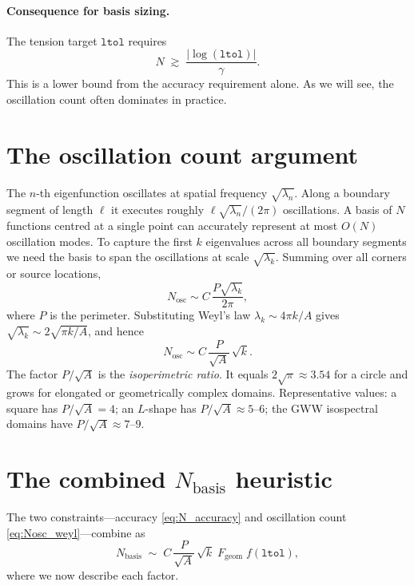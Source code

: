 \documentclass[11pt]{article}
\newcommand{\Nbasis}{N_{\mathrm{basis}}}
\newcommand{\Nosc}{N_{\mathrm{osc}}}
\newcommand{\ltol}{\texttt{ltol}}
\begin{document}
\paragraph{Consequence for basis sizing.}
The tension target $\ltol$ requires
\begin{equation}\label{eq:N_accuracy}
  N \;\gtrsim\; \frac{|\log(\ltol)|}{\gamma}.
\end{equation}
This is a lower bound from the accuracy requirement alone.  As we will see, the
oscillation count often dominates in practice.

\section{The oscillation count argument}

The $n$-th eigenfunction oscillates at spatial frequency $\sqrt{\lambda_n}$.
Along a boundary segment of length $\ell$ it executes roughly
$\ell\sqrt{\lambda_n}/(2\pi)$ oscillations.  A basis of $N$ functions centred
at a single point can accurately represent at most $O(N)$ oscillation modes.
To capture the first $k$ eigenvalues across all boundary segments we need the
basis to span the oscillations at scale $\sqrt{\lambda_k}$.  Summing over all
corners or source locations,
\begin{equation}\label{eq:Nosc}
  \Nosc \sim C\,\frac{P\sqrt{\lambda_k}}{2\pi},
\end{equation}
where $P$ is the perimeter.  Substituting Weyl's law
$\lambda_k \sim 4\pi k/A$ gives $\sqrt{\lambda_k} \sim 2\sqrt{\pi k/A}$, and
hence
\begin{equation}\label{eq:Nosc_weyl}
  \Nosc \sim C\,\frac{P}{\sqrt{A}}\,\sqrt{k}.
\end{equation}
The factor $P/\sqrt{A}$ is the \emph{isoperimetric ratio}.  It equals
$2\sqrt\pi\approx 3.54$ for a circle and grows for elongated or geometrically
complex domains.  Representative values: a square has $P/\sqrt{A}=4$; an
$L$-shape has $P/\sqrt{A}\approx 5$--$6$; the GWW isospectral domains have
$P/\sqrt{A}\approx 7$--$9$.

\section{The combined \texorpdfstring{$\Nbasis$}{N\_basis} heuristic}

The two constraints---accuracy \eqref{eq:N_accuracy} and oscillation count
\eqref{eq:Nosc_weyl}---combine as
\begin{equation}\label{eq:heuristic}
  \Nbasis
  \;\sim\;
  C\,\frac{P}{\sqrt{A}}\,\sqrt{k}\;F_{\mathrm{geom}}\;f(\ltol),
\end{equation}
where we now describe each factor.
\end{document}
